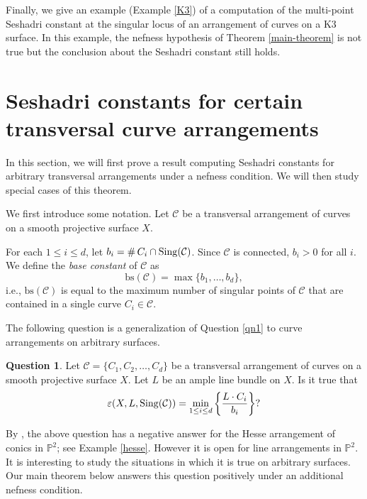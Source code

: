 \documentclass[12pt,reqno]{amsart}
\theoremstyle{plain}
\numberwithin{equation}{section}
\theoremstyle{definition}
\newtheorem{question}[theorem]{Question}
\newtheorem{definition}[theorem]{Definition}
\begin{document}
Finally, we give an example (Example \ref{K3}) of a computation of the multi-point Seshadri constant at the singular locus of an arrangement of curves on a K3 surface. In this example, the nefness hypothesis of Theorem \ref{main-theorem} is not true but the conclusion about the Seshadri constant still holds. 
	
	\section{Seshadri constants for certain transversal curve arrangements}\label{main}	

In this section, we will first prove a result computing Seshadri constants for arbitrary transversal arrangements under a nefness condition. We will then study special cases of this theorem. 


We first introduce some notation. 
		Let $\mathcal{C}$ be a transversal arrangement of curves on a smooth projective surface $X$. 
  
  For each $1\le i \le d$, let $b_i =  \# \, C_{i} \cap {\rm Sing}(\mathcal{C})$. Since $\mathcal{C}$ is connected, $b_i >0$ for all $i$.
   We define the \emph{base constant} of $\mathcal{C}$ as 
   $$\text{bs}(\mathcal{C}) = \max\{b_1,\dots, b_d\},$$ i.e., 
$\text{bs}(\mathcal{C})$		
  is equal to the maximum number of singular points  of $\mathcal{C}$ that are contained in a single curve $C_{i} \in \mathcal{C}$.
 

The following question is a generalization of Question \ref{qn1} to curve arrangements on arbitrary surfaces. 


	\begin{question}\label{question}
		Let $\mathcal{C} =\{C_1,C_2, \ldots ,C_d\}$ be a transversal arrangement of curves on a smooth projective surface $X$. Let $L$ be an ample line bundle on $X$. Is it true that
		\begin{equation*}
  \varepsilon(X, L,{\rm Sing}(\mathcal{C})) =  \min_{1\le i \le d}\left\{\frac{L\cdot C_i}{b_i}\right\}?
		\end{equation*}
	\end{question}


By \cite[Example 3.5]{JP}, the above question has a negative answer for the Hesse arrangement of conics 
in $\mathbb{P}^2$; see Example \ref{hesse}. However it is open for line arrangements in $\mathbb{P}^2$. 
It is interesting to study the situations in which it is true on arbitrary surfaces. Our main theorem below answers this question positively under an additional nefness condition. 
\end{document}
